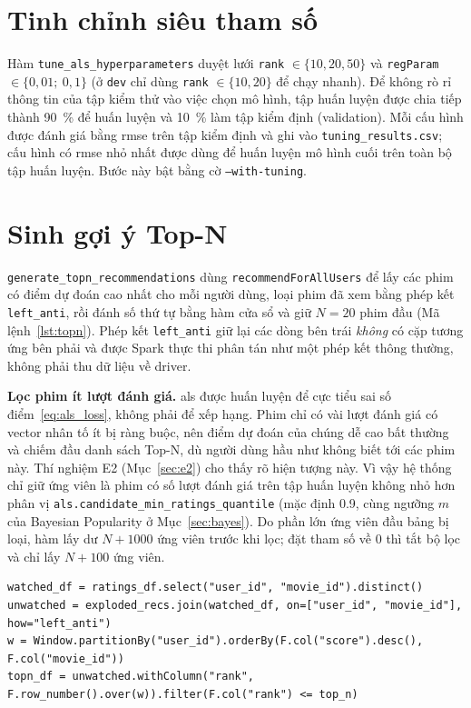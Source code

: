 \section{Tinh chỉnh siêu tham số}
\label{sec:tuning}
Hàm \texttt{tune\_als\_hyperparameters} duyệt lưới \texttt{rank} $\in \{10, 20, 50\}$ và \texttt{regParam} $\in \{0{,}01;\ 0{,}1\}$ (ở \texttt{dev} chỉ dùng \texttt{rank} $\in \{10, 20\}$ để chạy nhanh). Để không rò rỉ thông tin của tập kiểm thử vào việc chọn mô hình, tập huấn luyện được chia tiếp thành \SI{90}{\percent} để huấn luyện và \SI{10}{\percent} làm tập kiểm định (validation). Mỗi cấu hình được đánh giá bằng \gls{rmse} trên tập kiểm định và ghi vào \texttt{tuning\_results.csv}; cấu hình có \gls{rmse} nhỏ nhất được dùng để huấn luyện mô hình cuối trên toàn bộ tập huấn luyện. Bước này bật bằng cờ \texttt{--with-tuning}.

\section{Sinh gợi ý Top-N}
\label{sec:topn}
\texttt{generate\_topn\_recommendations} dùng \texttt{recommendForAllUsers} để lấy các phim có điểm dự đoán cao nhất cho mỗi người dùng, loại phim đã xem bằng phép kết \texttt{left\_anti}, rồi đánh số thứ tự bằng hàm cửa sổ và giữ $N = 20$ phim đầu (Mã lệnh~\ref{lst:topn}). Phép kết \texttt{left\_anti} giữ lại các dòng bên trái \emph{không} có cặp tương ứng bên phải và được Spark thực thi phân tán như một phép kết thông thường, không phải thu dữ liệu về driver.

\textbf{Lọc phim ít lượt đánh giá.} \gls{als} được huấn luyện để cực tiểu sai số điểm~\eqref{eq:als_loss}, không phải để xếp hạng. Phim chỉ có vài lượt đánh giá có vector nhân tố ít bị ràng buộc, nên điểm dự đoán của chúng dễ cao bất thường và chiếm đầu danh sách Top-N, dù người dùng hầu như không biết tới các phim này. Thí nghiệm E2 (Mục~\ref{sec:e2}) cho thấy rõ hiện tượng này. Vì vậy hệ thống chỉ giữ ứng viên là phim có số lượt đánh giá trên tập huấn luyện không nhỏ hơn phân vị \texttt{als.candidate\_min\_ratings\_quantile} (mặc định \num{0,9}, cùng ngưỡng $m$ của Bayesian Popularity ở Mục~\ref{sec:bayes}). Do phần lớn ứng viên đầu bảng bị loại, hàm lấy dư $N + 1000$ ứng viên trước khi lọc; đặt tham số về \num{0} thì tắt bộ lọc và chỉ lấy $N + 100$ ứng viên.

\begin{lstlisting}[caption={Loại phim đã xem và giữ Top-N}, label={lst:topn}]
watched_df = ratings_df.select("user_id", "movie_id").distinct()
unwatched = exploded_recs.join(watched_df, on=["user_id", "movie_id"], how="left_anti")
w = Window.partitionBy("user_id").orderBy(F.col("score").desc(), F.col("movie_id"))
topn_df = unwatched.withColumn("rank", F.row_number().over(w)).filter(F.col("rank") <= top_n)
\end{lstlisting}

